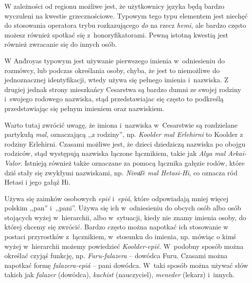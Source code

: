 \begin{spacing}{1.1}
W zależności od regionu możliwe jest, że użytkownicy języka będą bardzo
wyczuleni na kwestie grzecznościowe. Typowym tego typu elementem jest niechęć
do stosowania operatora trybu rozkazującego \emph{do} na rzecz \emph{hemi},
ale bardzo często możesz również spotkać się z~honoryfikatorami. Pewną istotną
kwestią jest również zwracanie się do innych osób.

W And́royas typowym jest używanie pierwszego imienia w~odniesieniu do rozmówcy,
lub podczas określania osoby, chyba, że jest to niemożliwe do jednoznacznej 
identyfikacji, wtedy używa się pełnego imienia i~nazwiska. Z drugiej jednak strony
mieszkańcy Cesarstwa są bardzo dumni ze swojej rodziny i~swojego rodowego nazwiska, 
stąd przedstawiajac się często to podkreślą przedstawiając się pełnym imieniem
oraz nazwiskiem.


Warto tutaj zwrócić uwagę, że imiona i~nazwiska w~Cesarstwie są rozdzielane 
partykułą \emph{mal}, oznaczającą ,,z rodziny'', np. \emph{Koolder mal Erlehirni}
to Koolder z rodziny Erlehirni. Czasami możliwe jest, że dzieci dziedziczą 
nazwiska po obojgu rodziców, stąd występują nazwiska łączone łącznikiem, takie 
jak \emph{Alya mal Arkai-Valor}. Istnieją również także oznaczane za pomocą 
łącznika gałęzie rodów, które dziś stały się zwykłymi nazwiskami, np. 
\emph{Nimu͞e mal Hetasi-Hi}, co oznacza ród Hetasi i jego gałąź Hi.

\skipline

Używa się zaimków osobowych \emph{epié} i~\emph{epiá}, które odpowiadają mniej
więcej polskim ,,pan'' i~,,pani''. Używa się ich w~odniesieniu do obcych osób albo
osób stojących wyżej w~hierarchii, albo w~sytuacji, kiedy nie znamy imienia 
osoby, do której chcemy się zwrócić. Bardzo często można napotkać ich stosowanie
w postaci przyrostków z~łącznikiem, w~stosunku do imienia, np. mówiąc o kimś
wyżej w~hierarchii możemy powiedzieć \emph{Koolder-epié}. W~podobny sposób
można określać czyjąś funkcję, np. \emph{Furu-falazera} -- dowódca Furu. Czasami
można napotkać formę \emph{falazera-epiá} -- pani dowódca. W~taki sposób można
używać słów takich jak \emph{falazer} (dowódca), \emph{kachist} (nauczyciel), 
\emph{meneder} (lekarz) i~innych.


\end{spacing}
